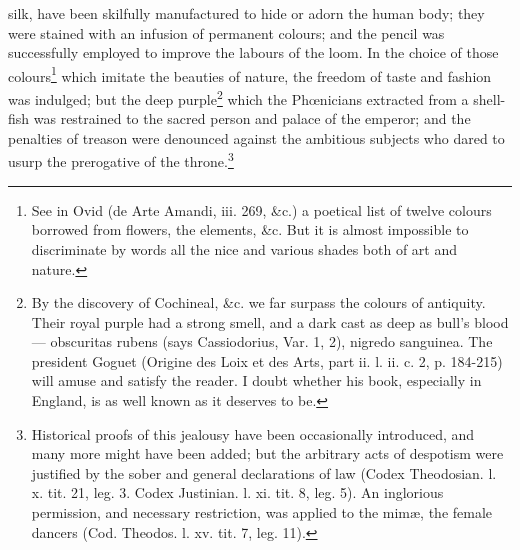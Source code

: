 silk, have been skilfully manufactured to hide or adorn the human body; they were stained with an infusion of permanent colours; and the pencil was successfully employed to improve the labours of the loom. In the choice of those colours\footnote{See in Ovid (de Arte Amandi, iii. 269, \&c.) a poetical list of twelve colours borrowed from flowers, the elements, \&c. But it is almost impossible to discriminate by words all the nice and various shades both of art and nature.} which imitate the beauties of nature, the freedom of taste and fashion was indulged; but the deep purple\footnote{By the discovery of Cochineal, \&c. we far surpass the colours of antiquity. Their royal purple had a strong smell, and a dark cast as deep as bull\texthebrew{}’s blood \texthebrew{—} obscuritas rubens (says Cassiodorius, Var. 1, 2), nigredo sanguinea. The president Goguet (Origine des Loix et des Arts, part ii. l. ii. c. 2, p. 184-215) will amuse and satisfy the reader. I doubt whether his book, especially in England, is as well known as it deserves to be.} which the Phœnicians extracted from a shell-fish was restrained to the sacred person and palace of the emperor; and the penalties of treason were denounced against the ambitious subjects who dared to usurp the prerogative of the throne.\footnote{Historical proofs of this jealousy have been occasionally introduced, and many more might have been added; but the arbitrary acts of despotism were justified by the sober and general declarations of law (Codex Theodosian. l. x. tit. 21, leg. 3. Codex Justinian. l. xi. tit. 8, leg. 5). An inglorious permission, and necessary restriction, was applied to the mimæ, the female dancers (Cod. Theodos. l. xv. tit. 7, leg. 11).}

